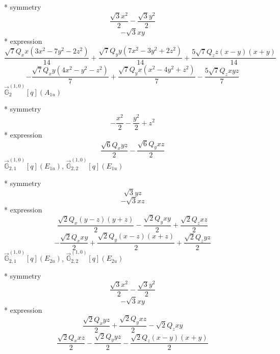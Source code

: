 \documentclass[fleqn,8pt]{jsarticle}
\begin{document}
\noindent\quad ** symmetry
\begin{dmath*}
\frac{\sqrt{3} x^{2}}{2} - \frac{\sqrt{3} y^{2}}{2}
\end{dmath*}
\begin{dmath*}
- \sqrt{3} x y
\end{dmath*}
\noindent\quad ** expression
\begin{dmath*}
\frac{\sqrt{7} Q_{x} x \left(3 x^{2} - 7 y^{2} - 2 z^{2}\right)}{14} + \frac{\sqrt{7} Q_{y} y \left(7 x^{2} - 3 y^{2} + 2 z^{2}\right)}{14} + \frac{5 \sqrt{7} Q_{z} z \left(x - y\right) \left(x + y\right)}{14}
\end{dmath*}
\begin{dmath*}
- \frac{\sqrt{7} Q_{x} y \left(4 x^{2} - y^{2} - z^{2}\right)}{7} + \frac{\sqrt{7} Q_{y} x \left(x^{2} - 4 y^{2} + z^{2}\right)}{7} - \frac{5 \sqrt{7} Q_{z} x y z}{7}
\end{dmath*}
\noindent\quad $\vec{\mathbb{G}}_{2}^{(1,0)}[q](A_{1u})$

\noindent\quad ** symmetry
\begin{dmath*}
- \frac{x^{2}}{2} - \frac{y^{2}}{2} + z^{2}
\end{dmath*}
\noindent\quad ** expression
\begin{dmath*}
\frac{\sqrt{6} Q_{x} y z}{2} - \frac{\sqrt{6} Q_{y} x z}{2}
\end{dmath*}
\noindent\quad $\vec{\mathbb{G}}_{2,1}^{(1,0)}[q](E_{1u})$, $\vec{\mathbb{G}}_{2,2}^{(1,0)}[q](E_{1u})$

\noindent\quad ** symmetry
\begin{dmath*}
\sqrt{3} y z
\end{dmath*}
\begin{dmath*}
- \sqrt{3} x z
\end{dmath*}
\noindent\quad ** expression
\begin{dmath*}
\frac{\sqrt{2} Q_{x} \left(y - z\right) \left(y + z\right)}{2} - \frac{\sqrt{2} Q_{y} x y}{2} + \frac{\sqrt{2} Q_{z} x z}{2}
\end{dmath*}
\begin{dmath*}
- \frac{\sqrt{2} Q_{x} x y}{2} + \frac{\sqrt{2} Q_{y} \left(x - z\right) \left(x + z\right)}{2} + \frac{\sqrt{2} Q_{z} y z}{2}
\end{dmath*}
\noindent\quad $\vec{\mathbb{G}}_{2,1}^{(1,0)}[q](E_{2u})$, $\vec{\mathbb{G}}_{2,2}^{(1,0)}[q](E_{2u})$

\noindent\quad ** symmetry
\begin{dmath*}
\frac{\sqrt{3} x^{2}}{2} - \frac{\sqrt{3} y^{2}}{2}
\end{dmath*}
\begin{dmath*}
- \sqrt{3} x y
\end{dmath*}
\noindent\quad ** expression
\begin{dmath*}
\frac{\sqrt{2} Q_{x} y z}{2} + \frac{\sqrt{2} Q_{y} x z}{2} - \sqrt{2} Q_{z} x y
\end{dmath*}
\begin{dmath*}
\frac{\sqrt{2} Q_{x} x z}{2} - \frac{\sqrt{2} Q_{y} y z}{2} - \frac{\sqrt{2} Q_{z} \left(x - y\right) \left(x + y\right)}{2}
\end{dmath*}
\end{document}
